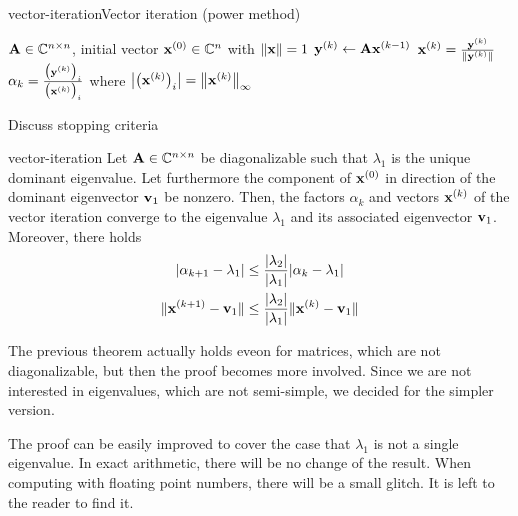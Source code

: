\begin{Algorithm*}{vector-iteration}{Vector iteration (power method)}
  \begin{algorithmic}[1]
    \Require $\mata\in\Cnn$, initial vector $\vx^{(0)}\in\C^n$ with $\norm{\vx}=1$
    \State $\vy^{(k)} \gets \mata \vx^{(k-1)}$
    \State $\vx^{(k)} = \frac{\vy^{(k)}}{\norm{\vy^{(k)}}}$
    \State $\alpha_k = \frac{\bigl(\vy^{(k)}\bigr)_i}{\bigl(\vx^{(k)}\bigr)_i}$ where $\abs*{\bigl(\vx^{(k)}\bigr)_i} = \norm*{\vx^{(k)}}_\infty $
    \EndFor
  \end{algorithmic}
\end{Algorithm*}

\begin{todo}
  Discuss stopping criteria  
\end{todo}

\begin{Theorem}{vector-iteration}
  Let $\mata\in\Cnn$ be diagonalizable such that $\lambda_1$ is the
  unique dominant eigenvalue. Let furthermore the component of
  $\vx^{(0)}$ in direction of the dominant eigenvector $\vv_1$ be
  nonzero. Then, the factors $\alpha_k$ and vectors $\vx^{(k)}$ of the
  vector iteration converge to the eigenvalue $\lambda_1$ and its
  associated eigenvector $\vv_1$. Moreover, there holds
  \begin{align}
    \abs{\alpha_{k+1}-\lambda_1}
    &\le \frac{\abs{\lambda_2}}{\abs{\lambda_1}} \abs{\alpha_{k}-\lambda_1}\\
    \norm{\vx^{(k+1)}-\vv_1}
    &\le \frac{\abs{\lambda_2}}{\abs{\lambda_1}} \norm{\vx^{(k)}-\vv_1}
  \end{align}
\end{Theorem}

\begin{remark}
  The previous theorem actually holds eveon for matrices, which are
  not diagonalizable, but then the proof becomes more involved. Since
  we are not interested in eigenvalues, which are not semi-simple, we
  decided for the simpler version.

  The proof can be easily improved to cover the case that $\lambda_1$
  is not a single eigenvalue. In exact arithmetic, there will be no
  change of the result. When computing with floating point numbers,
  there will be a small glitch. It is left to the reader to find it.
\end{remark}

